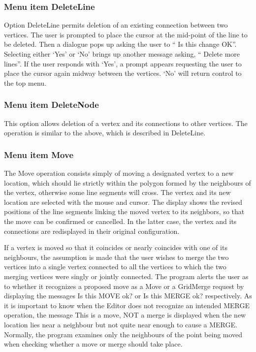 \documentclass{article}
\begin{document}
\subsubsection[Menu item DeleteLine]{Menu item DeleteLine}
Option DeleteLine permits deletion of an existing connection between two vertices. The user is prompted to place the cursor at the mid-point of the line to be deleted. Then a dialogue pops up asking the user to `` Is this change OK''. Selecting either `Yes' or `No' brings up another message asking, `` Delete more lines''. If the user responds with `Yes', a prompt appears requesting the user to place the cursor again midway between the vertices. `No' will return control to the top menu.

\subsubsection[Menu item DeleteNode]{Menu item DeleteNode}
This option allows deletion of a vertex and its connections to other vertices. The operation is similar to the above, which is described in DeleteLine. 

\subsubsection[Menu item Move]{Menu item Move}
The Move operation consists simply of moving a designated vertex to a new location, which should lie strictly within the polygon formed by the neighbours of the vertex, otherwise some line segments will cross. The vertex and its new location are selected with the mouse and cursor. The display shows the revised positions of the line segments linking the moved vertex to its neighbors, so that the move can be confirmed or cancelled. In the latter case, the vertex and its connections are redisplayed in their original configuration. 

If a vertex is moved so that it coincides or nearly coincides with one of its neighbours, the assumption is made that the user wishes to merge the two vertices into a single vertex connected to all the vertices to which the two merging vertices were singly or jointly connected. The program alerts the user as to whether it recognizes a proposed move as a Move or a GridMerge request by displaying the messages {\textquotedbl}Is this MOVE ok?{\textquotedbl} or {\textquotedbl}Is this MERGE ok?{\textquotedbl} respectively. As it is important to know when the Editor does not recognize an intended MERGE operation, the message {\textquotedbl}This is a move, NOT a merge{\textquotedbl} is displayed when the new location lies near a neighbour but not quite near enough to cause a MERGE. Normally, the program examines only the neighbours of the point being moved when checking whether a move or merge should take place.
\end{document}
